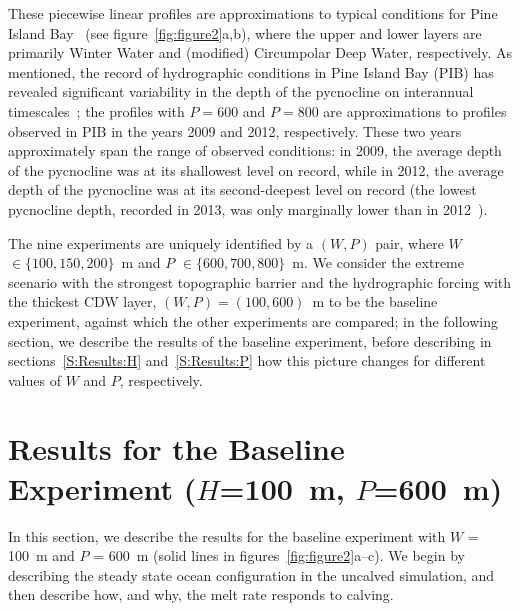 \documentclass[draft]{agujournal2019}
\begin{document}
These piecewise linear profiles are approximations to typical conditions for Pine Island Bay~\cite{Jacobs1996GRL, Dutrieux2014Science, Jenkins2018NatureGeo} (see figure~\ref{fig:figure2}a,b), where the upper and lower layers are primarily Winter Water and (modified) Circumpolar Deep Water, respectively. As mentioned, the record of hydrographic conditions in Pine Island Bay (PIB) has revealed significant variability in the depth of the pycnocline on interannual timescales~\cite{Dutrieux2014Science}; the profiles with $P = 600$ and $P = 800$ are approximations to profiles observed in PIB in the years 2009 and 2012, respectively. These two years approximately span the range of observed conditions: in 2009, the average depth of the pycnocline was at its shallowest level on record, while in 2012, the average depth of the pycnocline was at its second-deepest level on record (the lowest pycnocline depth, recorded in 2013, was only marginally lower than in 2012~\cite{Webber2017NatureComms}).

The nine experiments are uniquely identified by a $(W,P)$ pair, where $W$ $\in \{100, 150, 200\}$~m and $P$ $\in \{600, 700, 800\}$~m. We consider the extreme scenario with the strongest topographic barrier and the hydrographic forcing with the thickest CDW layer, $(W,P) = (100,600)$~m to be the baseline experiment, against which the other experiments are compared; in the following section, we describe the results of the baseline experiment, before describing in sections~\ref{S:Results:H} and~\ref{S:Results:P} how this picture changes for different values of $W$ and $P$, respectively.


\section{Results for the Baseline Experiment ($H$=100~m, $P$=600~m)}\label{S:Baseline}
In this section, we describe the results for the baseline experiment with $W$ = 100~m and $P$ = 600~m (solid lines in figures~\ref{fig:figure2}a--c). We begin by describing the steady state ocean configuration in the uncalved simulation, and then describe how, and why, the melt rate responds to calving.
\end{document}
